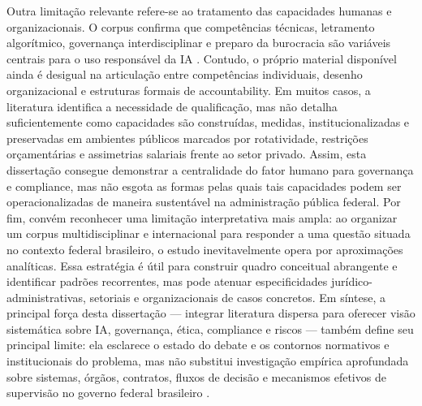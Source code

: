 \documentclass[12pt,a4paper]{article}
\begin{document}
Outra limitação relevante refere-se ao tratamento das capacidades humanas e organizacionais. O corpus confirma que competências técnicas, letramento algorítmico, governança interdisciplinar e preparo da burocracia são variáveis centrais para o uso responsável da IA \autocite{melo2026competencias} \autocite{chilunjika2022artificial} \autocite{cho2023human} \autocite{barros2025inteligencia}. Contudo, o próprio material disponível ainda é desigual na articulação entre competências individuais, desenho organizacional e estruturas formais de accountability. Em muitos casos, a literatura identifica a necessidade de qualificação, mas não detalha suficientemente como capacidades são construídas, medidas, institucionalizadas e preservadas em ambientes públicos marcados por rotatividade, restrições orçamentárias e assimetrias salariais frente ao setor privado. Assim, esta dissertação consegue demonstrar a centralidade do fator humano para governança e compliance, mas não esgota as formas pelas quais tais capacidades podem ser operacionalizadas de maneira sustentável na administração pública federal.
Por fim, convém reconhecer uma limitação interpretativa mais ampla: ao organizar um corpus multidisciplinar e internacional para responder a uma questão situada no contexto federal brasileiro, o estudo inevitavelmente opera por aproximações analíticas. Essa estratégia é útil para construir quadro conceitual abrangente e identificar padrões recorrentes, mas pode atenuar especificidades jurídico-administrativas, setoriais e organizacionais de casos concretos. Em síntese, a principal força desta dissertação — integrar literatura dispersa para oferecer visão sistemática sobre IA, governança, ética, compliance e riscos — também define seu principal limite: ela esclarece o estado do debate e os contornos normativos e institucionais do problema, mas não substitui investigação empírica aprofundada sobre sistemas, órgãos, contratos, fluxos de decisão e mecanismos efetivos de supervisão no governo federal brasileiro \autocite{goulart2025processos} \autocite{serra2024a} \autocite{madan2022ai}.
\end{document}
